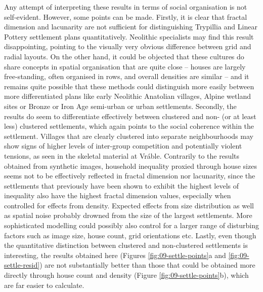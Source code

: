 \documentclass[
  12pt,
]{book}
\begin{document}
Any attempt of interpreting these results in terms of social organisation is not self-evident. However, some points can be made. Firstly, it is clear that fractal dimension and lacunarity are not sufficient for distinguishing Trypillia and Linear Pottery settlement plans quantitatively. Neolithic specialists may find this result disappointing, pointing to the visually very obvious difference between grid and radial layouts. On the other hand, it could be objected that these cultures do share concepts in spatial organisation that are quite close -- houses are largely free-standing, often organised in rows, and overall densities are similar -- and it remains quite possible that these methods could distinguish more easily between more differentiated plans like early Neolithic Anatolian villages, Alpine wetland sites or Bronze or Iron Age semi-urban or urban settlements. Secondly, the results do seem to differentiate effectively between clustered and non- (or at least less) clustered settlements, which again points to the social coherence within the settlement. Villages that are clearly clustered into separate neighbourhoods may show signs of higher levels of inter-group competition and potentially violent tensions, as seen in the skeletal material at Vráble. Contrarily to the results obtained from synthetic images, household inequality proxied through house sizes seems not to be effectively reflected in fractal dimension nor lacunarity, since the settlements that previously have been shown to exhibit the highest levels of inequality also have the highest fractal dimension values, especially when controlled for effects from density. Expected effects from size distribution as well as spatial noise probably drowned from the size of the largest settlements. More sophisticated modelling could possibly also control for a larger range of disturbing factors such as image size, house count, grid orientations etc. Lastly, even though the quantitative distinction between clustered and non-clustered settlements is interesting, the results obtained here (Figures \ref{fig:09-settle-points}a and \ref{fig:09-settle-resid}) are not substantially better than those that could be obtained more directly through house count and density (Figure \ref{fig:09-settle-points}b), which are far easier to calculate.
\end{document}
